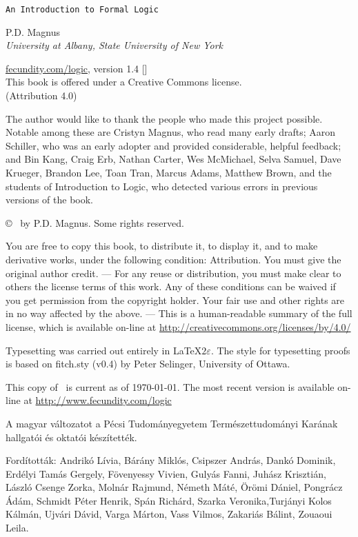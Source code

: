 \thispagestyle{empty}
{\Huge\forallx}

{\tt An Introduction to Formal Logic}

\vfill


{\sf P.D. Magnus}\\
\emph{University at Albany, State University of New York}


\vfill


{\sf
	\href{https://www.fecundity.com/logic/}{fecundity.com/logic}, version 1.4 [\bookversion]\\
	This book is offered under a Creative Commons license.\\
	(Attribution 4.0)
}



\newpage
\thispagestyle{empty}%
{\sf
The author would like to thank the people who made this project possible. Notable among these are Cristyn Magnus, who read many early drafts; Aaron Schiller, who was an early adopter and provided considerable, helpful feedback; {and} Bin Kang, Craig Erb, Nathan Carter, Wes McMichael, Selva Samuel,  Dave Krueger, Brandon Lee, Toan Tran, Marcus Adams, Matthew Brown, and the students of Introduction to Logic, who detected various errors in previous versions of the book.
}

\vfill
{
\copyright\  by P.D. Magnus. Some rights reserved.
}

{\footnotesize
You are free to copy this book, to distribute it, to display it, and to make derivative works, under the following condition: Attribution. You must give the original author credit. --- For any reuse or distribution, you must make clear to others the license terms of this work. Any of these conditions can be waived if you get permission from the copyright holder. Your fair use and other rights are in no way affected by the above. --- This is a human-readable summary of the full license, which is available on-line at \url{http://creativecommons.org/licenses/by/4.0/}
}

{
Typesetting was carried out entirely in \LaTeX$2\varepsilon$. The style for typesetting proofs is based on fitch.sty (v0.4) by Peter Selinger, University of Ottawa.

This copy of \forallx\ is current as of \today. The most recent version is available on-line at \url{http://www.fecundity.com/logic}
}

{
A magyar változatot a Pécsi Tudományegyetem Természettudományi Karának hallgatói és oktatói készítették.

Fordították: Andrikó Lívia, Bárány Miklós, Csipszer András, Dankó Dominik, Erdélyi Tamás Gergely,
Fövenyessy Vivien, Gulyás Fanni, Juhász Krisztián, László Csenge Zorka, Molnár Rajmund,
Németh Máté, Örömi Dániel, Pongrácz Ádám, Schmidt Péter Henrik, Spán Richárd,
Szarka Veronika,Turjányi Kolos Kálmán, Ujvári Dávid,
Varga Márton, Vass Vilmos, Zakariás Bálint, Zouaoui Leila.
}